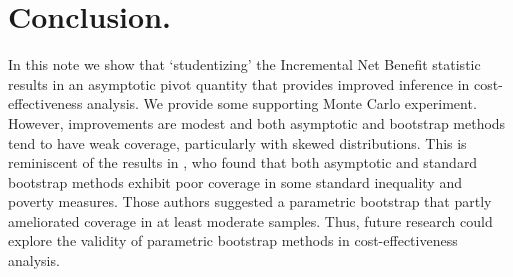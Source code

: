 \documentclass[english, 11pt,a4paper, ]{article}
\begin{document}
\section{Conclusion.}
In this note we show  that  `studentizing' the Incremental Net Benefit statistic results in an asymptotic pivot quantity that provides improved inference in cost-effectiveness analysis. We  provide some supporting Monte Carlo experiment. However, improvements are modest and both  asymptotic and bootstrap methods tend to have weak coverage, particularly with skewed distributions. This is reminiscent of the results in \cite{davidsonFlachaire2007joe}, who found that both asymptotic and standard bootstrap methods exhibit poor coverage in some standard inequality and poverty measures. Those authors suggested a parametric bootstrap that partly ameliorated coverage in at least moderate samples. Thus, future research could explore the validity of parametric bootstrap methods in cost-effectiveness analysis.   
 





\newpage
\end{document}
